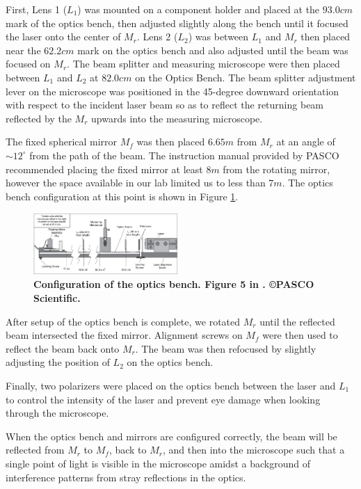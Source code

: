 \documentclass[twocolumn]{article}
\begin{document}
		First, Lens 1 ($L_1$) was mounted on a component holder and placed at the $93.0 cm$ mark of the optics bench, then adjusted slightly along the bench until it focused the laser onto the center of $M_r$. 
		Lens 2 ($L_2$) was between $L_1$ and $M_r$ then placed near the $62.2 cm$ mark on the optics bench and also adjusted until the beam was focused on $M_r$.  
		The beam splitter and measuring microscope were then placed between $L_1$ and $L_2$ at $82.0 cm$ on the Optics Bench.  
		The beam splitter adjustment lever on the microscope was positioned in the 45-degree downward orientation with respect to the incident laser beam so as to reflect the returning beam reflected by the $M_r$ upwards into the measuring microscope.
		
		The fixed spherical mirror $M_f$ was then placed $6.65m$ from $M_r$ at an angle of $\sim12^{\circ}$ from the path of the beam.
		The instruction manual provided by PASCO \cite{lee_instruction_????} recommended placing the fixed mirror at least $8m$ from the rotating mirror, however the space available in our lab limited us to less than $7m$.
		The optics bench configuration at this point is shown in Figure \ref{fig:EquipConfig}.
		\begin{figure}[!ht]
			\centering
			\includegraphics[width=0.49\textwidth]{Images/PASCO_EquipmentAlignment.png}
			\caption{\textbf{Configuration of the optics bench. Figure 5 in \cite{lee_instruction_????}. \copyright PASCO Scientific.}}
			\label{fig:EquipConfig}
		\end{figure}
		
		After setup of the optics bench is complete, we rotated $M_r$ until the reflected beam intersected the fixed mirror.
		Alignment screws on $M_f$ were then used to reflect the beam back onto $M_r$.
		The beam was then refocused by slightly adjusting the position of $L_2$ on the optics bench.  
		
		Finally, two polarizers were placed on the optics bench between the laser and $L_1$ to control the intensity of the laser and prevent eye damage when looking through the microscope.
		
		When the optics bench and mirrors are configured correctly, the beam will be reflected from $M_r$ to $M_f$, back to $M_r$, and then into the microscope such that a single point of light is visible in the microscope amidst a background of interference patterns from stray reflections in the optics.
\end{document}
